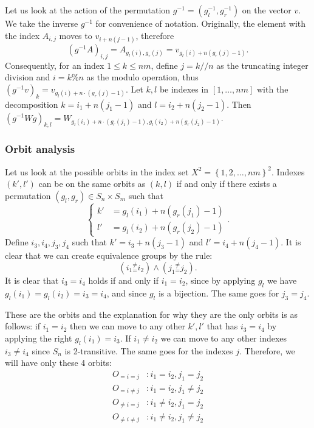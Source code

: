 \documentclass[english]{article}
\begin{document}
Let us look at the action of the permutation $g^{-1}=(g_l^{-1},g_r^{-1})$
on the vector $v$. We take the inverse $g^{-1}$ for convenience of notation.
Originally, the element with the index $A_{i,j}$ moves to $v_{i+n(j-1)}$,
therefore 
\begin{equation}
\left(g^{-1}A\right)_{i,j}
=
A_{g_l(i),g_r(j)}
=
v_{g_l(i)+n\left(g_r(j)-1\right)}
.
\end{equation}
Consequently, for an index $1\leq k\leq nm$, define $j=k//n$ as the
truncating integer division and $i=k\%n$ as the modulo operation, thus 
$\left(g^{-1}v\right)_k=v_{g_l(i)+n\cdot\left(g_r(j)-1\right)}$.
Let $k,l$ be indexes in $\left[1,\ldots,nm\right]$ with the decomposition
$k=i_1+n(j_1-1)$ and $l=i_2+n(j_2-1)$. 
Then 
$\left(g^{-1}Wg\right)_{k,l}
=
W_{g_l(i_1)+n\cdot\left(g_r(j_1)-1\right),g_l(i_2)+n\left(g_r(j_2)-1\right)}$. 

\subsubsection{Orbit analysis}

Let us look at the possible orbits in the index set $X^{2}=\left\{ 1,2,\ldots,nm\right\} ^{2}$.
Indexes $\left(k',l'\right)$ can be on the same orbits as $\left(k,l\right)$
if and only if there exists a permutation $\left(g_l,g_r\right)\in S_n\times S_{m}$
such that 
\begin{equation}
\begin{cases}
k' & =g_l(i_1)+n\left(g_r(j_1)-1\right)\\
l' & =g_l(i_2)+n\left(g_r(j_2)-1\right)
\end{cases}
\label{eq:indexes_transformation}
.
\end{equation}
Define $i_3,i_4,j_3,j_4$ such that $k'=i_3+n(j_3-1)$
and $l'=i_4+n(j_4-1)$. It is clear that we can create equivalence
groups by the rule: 
\begin{equation}
\left(i_1{}_{=}^{\neq}i_2\right)
\wedge
\left(j_1{}_{=}^{\neq}j_2\right)
.
\end{equation}
It is clear that $i_3=i_4$ holds if and only if $i_1=i_2$,
since by applying $g_l$ we have $g_l(i_1)=g_l(i_2)=i_3=i_4$,
and since $g_l$ is a bijection. The same goes for $j_3=j_4$. 

These are the orbits and the explanation for why they are the only orbits
is as follows: if $i_1=i_2$ then we can move to any other $k',l'$
that has $i_3=i_4$ by applying the right $g_l(i_1)=i_3$.
If $i_1\neq i_2$ we can move to any other indexes $i_3\neq i_4$
since $S_n$ is 2-transitive. The same goes for the indexes $j$. Therefore,
we will have only these 4 orbits:
\begin{align*}
O_{=i=j} & :i_1=i_2,j_1=j_2\\
O_{=i\neq j} & :i_1=i_2,j_1\neq j_2\\
O_{\neq i=j} & :i_1\neq i_2,j_1=j_2\\
O_{\neq i\neq j} & :i_1\neq i_2,j_1\neq j_2
\end{align*}
\end{document}
